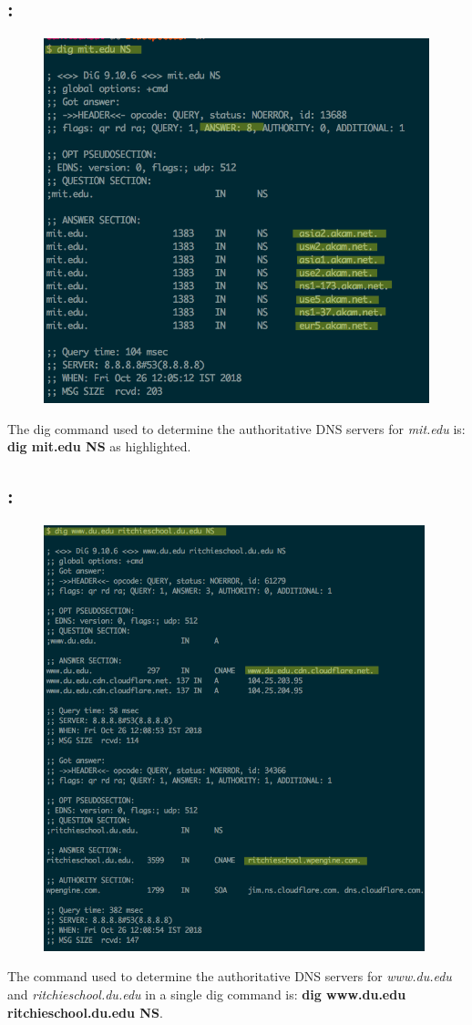 \documentclass[]{report}
\begin{document}
\subsection{:}
\begin{figure}[H]
	\vspace{0pt}
	\includegraphics[height = 300pt, keepaspectratio]{Snapshots/q4/4_1.png}
\end{figure}
The dig command used to determine the authoritative DNS servers for \textit{mit.edu} is: \textbf{dig mit.edu NS} as highlighted. 

\subsection{:}
\begin{figure}[H]
	\vspace{0pt}
	\includegraphics[height = 350pt, keepaspectratio]{Snapshots/q4/4_2.png}
\end{figure}
The command used to determine the authoritative DNS servers for \textit{www.du.edu} and \textit{ritchieschool.du.edu} in a single dig command is: \textbf{dig www.du.edu ritchieschool.du.edu NS}. \\
\end{document}
